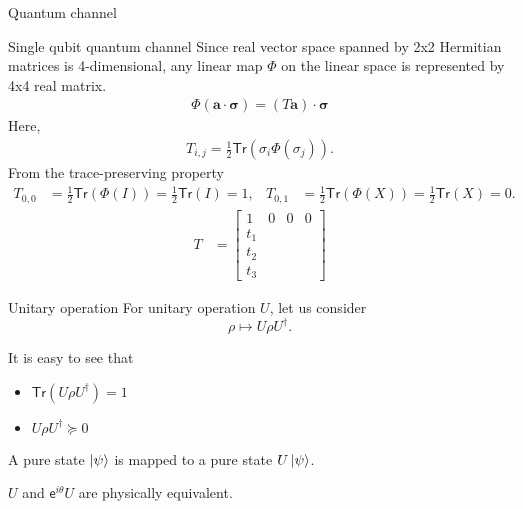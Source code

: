 \documentclass{beamer}
\newcommand{\Tr}{\mathsf{Tr}}
\newcommand\bm[1]{{\mathbf{#1}}}
\begin{document}
\begin{frame}{Quantum channel}
\end{frame}

\begin{frame}{Single qubit quantum channel}
Since real vector space spanned by 2x2 Hermitian matrices is 4-dimensional, any linear map $\Phi$ on the linear space
is represented by 4x4 real matrix.
\begin{align*}
\Phi\left(\bm{a}\cdot \bm{\sigma}\right)
=
(T\bm{a})\cdot \bm{\sigma}
\end{align*}
Here,
\begin{align*}
T_{i,j} = \frac12\Tr(\sigma_i\Phi(\sigma_j)).
\end{align*}
From the trace-preserving property
\begin{align*}
T_{0,0} &= \frac12\Tr(\Phi(I)) = \frac12\Tr(I) = 1,&
T_{0,1} &= \frac12\Tr(\Phi(X)) = \frac12\Tr(X) = 0.
\end{align*}
\begin{align*}
T &=
\begin{bmatrix}
1&0&0&0\\
t_1&\\
t_2&\\
t_3
\end{bmatrix}
\end{align*}
\end{frame}

\begin{frame}{Unitary operation}
For unitary operation $U$, let us consider
\begin{equation*}
\rho\mapsto U\rho U^\dagger.
\end{equation*}

\vspace{2em}
It is easy to see that
\begin{itemize}
\item $\Tr(U\rho U^\dagger)=1$
\item $U\rho U^\dagger\succeq 0$
\end{itemize}

\vspace{3em}
A pure state $\ket{\psi}$ is mapped to a pure state $U\ket{\psi}$.

\vspace{2em}
$U$ and $\mathsf{e}^{i\theta}U$ are physically equivalent.
\end{frame}
\end{document}
